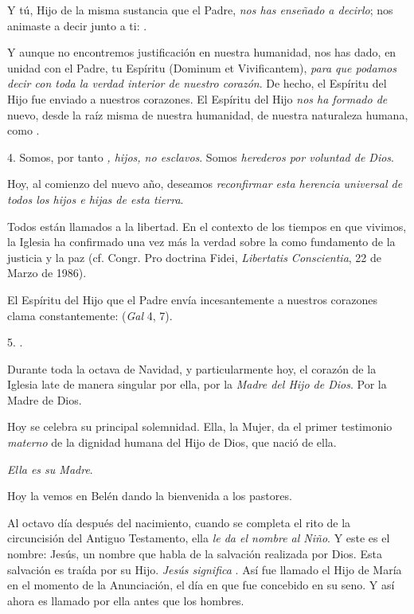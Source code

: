 \begin{body}
	Y tú, Hijo de la misma sustancia que el Padre, \emph{nos has enseñado a 	decirlo}; nos animaste a decir junto a ti: .
	
	Y aunque no encontremos justificación en nuestra humanidad, nos has dado, en unidad con el Padre, tu Espíritu  (Dominum et Vivificantem), \emph{para que podamos decir  	con toda la verdad interior de nuestro corazón}. De hecho, el Espíritu del Hijo fue enviado a nuestros corazones. El Espíritu del Hijo \emph{nos ha formado de} nuevo, desde la raíz misma de nuestra humanidad, de nuestra naturaleza humana, como .
	
	4. Somos, por tanto \emph{, hijos, no esclavos}. Somos \emph{herederos 	por voluntad de Dios}.
	
	Hoy, al comienzo del nuevo año, deseamos \emph{reconfirmar esta herencia 	universal de todos los hijos e hijas de esta tierra}.
	
	Todos están llamados a la libertad. En el contexto de los tiempos en que vivimos, la Iglesia ha confirmado una vez más la verdad sobre la  como fundamento de la justicia y la paz (cf. Congr. Pro doctrina Fidei, \emph{Libertatis Conscientia}, 22 de Marzo de 1986).
	
	El Espíritu del Hijo que el Padre envía incesantemente a nuestros corazones clama constantemente:  (\emph{Gal} 4, 7).
	
	5. .
	
	Durante toda la octava de Navidad, y particularmente hoy, el corazón de la Iglesia late de manera singular por ella, por la \emph{Madre del Hijo 	de Dios}. Por la Madre de Dios.
	
	Hoy se celebra su principal solemnidad. Ella, la Mujer, da el primer testimonio \emph{materno} de la dignidad humana del Hijo de Dios, que nació de ella.
	
	\emph{Ella es su Madre}.
	
	Hoy la vemos en Belén dando la bienvenida a los pastores.
	
	Al octavo día después del nacimiento, cuando se completa el rito de la circuncisión del Antiguo Testamento, ella \emph{le da el nombre al 	Niño}. Y este es el nombre: Jesús, un nombre que habla de la salvación realizada por Dios. Esta salvación es traída por su Hijo. \emph{Jesús 	significa }. Así fue llamado el Hijo de María en el momento de la Anunciación, el día en que fue concebido en su seno. Y así ahora es llamado por ella antes que los hombres.
	

\end{body}
